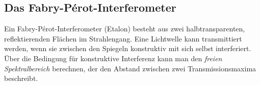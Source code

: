 \subsection{Das Fabry-Pérot-Interferometer}
\label{sub:etalon}
Ein Fabry-Pérot-Interferometer (Etalon) besteht aus zwei halbtransparenten, reflektierenden Flächen
im Strahlengang.
Eine Lichtwelle kann transmittiert werden, wenn sie zwischen den Spiegeln konstruktiv mit sich selbst interferiert.
Über die Bedingung für konstruktive Interferenz kann man den \emph{freien Spektralbereich} berechnen,
der den Abstand zwischen zwei Transmissionsmaxima beschreibt.
